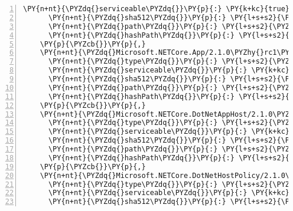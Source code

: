 \begin{Verbatim}[commandchars=\\\{\},numbers=left,firstnumber=1,stepnumber=1,numberblanklines=0]
      \PY{n+nt}{\PYZdq{}serviceable\PYZdq{}}\PY{p}{:} \PY{k+kc}{true}\PY{p}{,}
      \PY{n+nt}{\PYZdq{}sha512\PYZdq{}}\PY{p}{:} \PY{l+s+s2}{\PYZdq{}sha512\PYZhy{}8iXu12QeCX4qiAPcg81+uWlcETteIKmxbb3dHGAZMITvzt2tqXa1oW43IUUZaCiOc4S+NLxoiAigiN81Av64iQ==\PYZdq{}}\PY{p}{,}
      \PY{n+nt}{\PYZdq{}path\PYZdq{}}\PY{p}{:} \PY{l+s+s2}{\PYZdq{}microsoft.entityframeworkcore.sqlite.core/2.1.0\PYZhy{}rc1\PYZhy{}final\PYZdq{}}\PY{p}{,}
      \PY{n+nt}{\PYZdq{}hashPath\PYZdq{}}\PY{p}{:} \PY{l+s+s2}{\PYZdq{}microsoft.entityframeworkcore.sqlite.core.2.1.0\PYZhy{}rc1\PYZhy{}final.nupkg.sha512\PYZdq{}}
    \PY{p}{\PYZcb{}}\PY{p}{,}
    \PY{n+nt}{\PYZdq{}Microsoft.NETCore.App/2.1.0\PYZhy{}rc1\PYZdq{}}\PY{p}{:} \PY{p}{\PYZob{}}
      \PY{n+nt}{\PYZdq{}type\PYZdq{}}\PY{p}{:} \PY{l+s+s2}{\PYZdq{}package\PYZdq{}}\PY{p}{,}
      \PY{n+nt}{\PYZdq{}serviceable\PYZdq{}}\PY{p}{:} \PY{k+kc}{true}\PY{p}{,}
      \PY{n+nt}{\PYZdq{}sha512\PYZdq{}}\PY{p}{:} \PY{l+s+s2}{\PYZdq{}sha512\PYZhy{}Y76lrh4O4CqQrZNp4CYcmdC8BmlMj8w19TMxJGogBZgciIq/h0Ine/gFivf2Qc4Ko2/CYafOIYBqyVqLYUXf8g==\PYZdq{}}\PY{p}{,}
      \PY{n+nt}{\PYZdq{}path\PYZdq{}}\PY{p}{:} \PY{l+s+s2}{\PYZdq{}microsoft.netcore.app/2.1.0\PYZhy{}rc1\PYZdq{}}\PY{p}{,}
      \PY{n+nt}{\PYZdq{}hashPath\PYZdq{}}\PY{p}{:} \PY{l+s+s2}{\PYZdq{}microsoft.netcore.app.2.1.0\PYZhy{}rc1.nupkg.sha512\PYZdq{}}
    \PY{p}{\PYZcb{}}\PY{p}{,}
    \PY{n+nt}{\PYZdq{}Microsoft.NETCore.DotNetAppHost/2.1.0\PYZhy{}rc1\PYZdq{}}\PY{p}{:} \PY{p}{\PYZob{}}
      \PY{n+nt}{\PYZdq{}type\PYZdq{}}\PY{p}{:} \PY{l+s+s2}{\PYZdq{}package\PYZdq{}}\PY{p}{,}
      \PY{n+nt}{\PYZdq{}serviceable\PYZdq{}}\PY{p}{:} \PY{k+kc}{true}\PY{p}{,}
      \PY{n+nt}{\PYZdq{}sha512\PYZdq{}}\PY{p}{:} \PY{l+s+s2}{\PYZdq{}sha512\PYZhy{}pljoDMtc2ZDWu+v2RosjokXh+PLgEofF4/Fk0ZFED0eFDlc7Cf3S9W9WTV1lSg2P0QUUxl9N9gNNlX2dcnAY6w==\PYZdq{}}\PY{p}{,}
      \PY{n+nt}{\PYZdq{}path\PYZdq{}}\PY{p}{:} \PY{l+s+s2}{\PYZdq{}microsoft.netcore.dotnetapphost/2.1.0\PYZhy{}rc1\PYZdq{}}\PY{p}{,}
      \PY{n+nt}{\PYZdq{}hashPath\PYZdq{}}\PY{p}{:} \PY{l+s+s2}{\PYZdq{}microsoft.netcore.dotnetapphost.2.1.0\PYZhy{}rc1.nupkg.sha512\PYZdq{}}
    \PY{p}{\PYZcb{}}\PY{p}{,}
    \PY{n+nt}{\PYZdq{}Microsoft.NETCore.DotNetHostPolicy/2.1.0\PYZhy{}rc1\PYZdq{}}\PY{p}{:} \PY{p}{\PYZob{}}
      \PY{n+nt}{\PYZdq{}type\PYZdq{}}\PY{p}{:} \PY{l+s+s2}{\PYZdq{}package\PYZdq{}}\PY{p}{,}
      \PY{n+nt}{\PYZdq{}serviceable\PYZdq{}}\PY{p}{:} \PY{k+kc}{true}\PY{p}{,}
      \PY{n+nt}{\PYZdq{}sha512\PYZdq{}}\PY{p}{:} \PY{l+s+s2}{\PYZdq{}sha512\PYZhy{}w60irQLvSJ/idAtGOm6yQPSrV8C8TEAPNyajjnw+e0cy00WTsM4c0412OVOLgBjnxSNUdSAh+552RzAGO6p0Pw==\PYZdq{}}\PY{p}{,}

\end{Verbatim}
